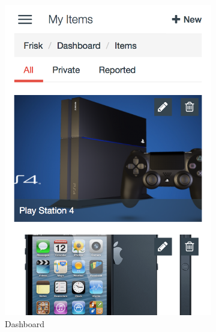 \begin{figure}[H]
	\centering
	\begin{subfigure}[t]{0.3\textwidth}
		\centering
		\includegraphics[width=1.0\textwidth]{images/Frisk/Mobile_Dashboard}
		\caption{Dashboard}\label{fig:Mobile_Dashboard}		
	\end{subfigure}
	\quad
	\begin{subfigure}[t]{0.3\textwidth}
		\centering

\end{subfigure}
\end{figure}
